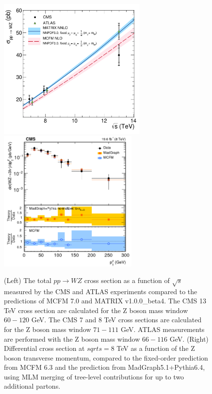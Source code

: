 \documentclass[10pt]{article}
\begin{document}
\begin{figure}[htb]
  \centering
    \includegraphics[height=2.8in]{figures/WZCrossSection_vs_sqrtS.pdf}
    \includegraphics[height=2.8in]{figures/WZ8TeV_ptZ_unfolded.png}
    \caption{ (Left) The total $pp \rightarrow WZ$ cross section
      as a function of $\sqrt{s}$ measured by the CMS and 
      ATLAS experiments compared to the predictions of MCFM 7.0 and MATRIX v1.0.0\_beta4. 
      The CMS 13 TeV cross section are calculated for the Z boson mass window $60 - 120$ GeV. 
      The CMS 7 and 8  TeV  cross sections are calculated for the Z boson mass window $71 - 111$ GeV.
      ATLAS measurements are performed with the Z boson mass window $66 - 116$  GeV.
      (Right) Differential cross section at $sqrt{s} = 8$ TeV as a function
      of the Z boson transverse momentum,
      compared to
      the fixed-order prediction from MCFM 6.3 and the prediction from
      MadGraph5.1+Pythia6.4, using MLM merging of tree-level contributions 
      for up to two additional partons.
      }
  \label{fig:WZfigs}
\end{figure}
\end{document}
